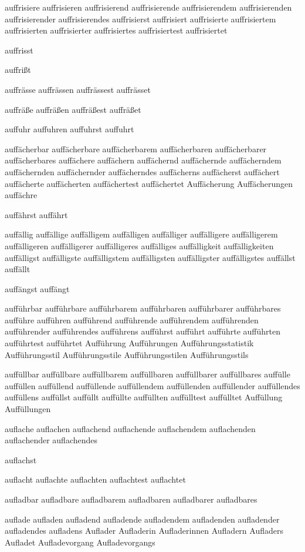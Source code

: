 auffrisiere auffrisieren auffrisierend auffrisierende auffrisierendem auffrisierenden auffrisierender auffrisierendes auffrisierst auffrisiert auffrisierte auffrisiertem auffrisierten auffrisierter auffrisiertes auffrisiertest auffrisiertet

auffrisst

auffrißt

auffrässe auffrässen auffrässest auffrässet

auffräße auffräßen auffräßest auffräßet

auffuhr auffuhren auffuhrst auffuhrt

auffächerbar auffächerbare auffächerbarem auffächerbaren auffächerbarer auffächerbares auffächere auffächern auffächernd auffächernde auffächerndem auffächernden auffächernder auffächerndes auffächerns auffächerst auffächert auffächerte auffächerten auffächertest auffächertet Auffächerung Auffächerungen auffächre

auffährst auffährt

auffällig auffällige auffälligem auffälligen auffälliger auffälligere auffälligerem auffälligeren auffälligerer auffälligeres auffälliges auffälligkeit auffälligkeiten auffälligst auffälligste auffälligstem auffälligsten auffälligster auffälligstes auffällst auffällt

auffängst auffängt

aufführbar aufführbare aufführbarem aufführbaren aufführbarer aufführbares aufführe aufführen aufführend aufführende aufführendem aufführenden aufführender aufführendes aufführens aufführst aufführt aufführte aufführten aufführtest aufführtet Aufführung Aufführungen Aufführungsstatistik Aufführungsstil Aufführungsstile Aufführungsstilen Aufführungsstils

auffüllbar auffüllbare auffüllbarem auffüllbaren auffüllbarer auffüllbares auffülle auffüllen auffüllend auffüllende auffüllendem auffüllenden auffüllender auffüllendes auffüllens auffüllst auffüllt auffüllte auffüllten auffülltest auffülltet Auffüllung Auffüllungen

auflache auflachen auflachend auflachende auflachendem auflachenden auflachender auflachendes

auflachst

auflacht auflachte auflachten auflachtest auflachtet

aufladbar aufladbare aufladbarem aufladbaren aufladbarer aufladbares

auflade aufladen aufladend aufladende aufladendem aufladenden aufladender aufladendes aufladens Auflader Aufladerin Aufladerinnen Aufladern Aufladers Aufladet Aufladevorgang Aufladevorgangs

